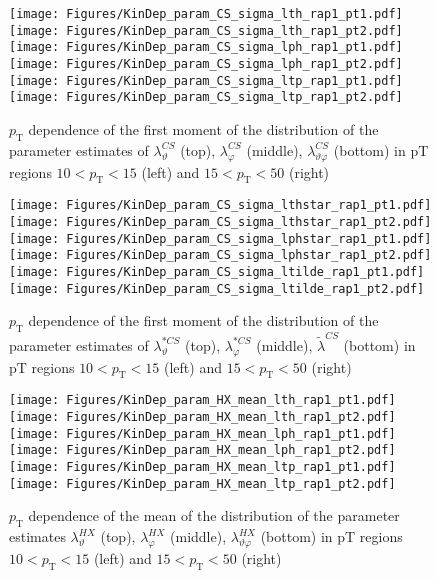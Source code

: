\documentclass[12pt]{article}
\newcommand{\pT}{p_\mathrm{T}}
\newcommand{\lamthCS}{\lambda^{\scriptscriptstyle CS}_\vartheta}
\newcommand{\lamphCS}{\lambda^{\scriptscriptstyle CS}_\varphi}
\newcommand{\lamthphCS}{\lambda^{\scriptscriptstyle CS}_{\vartheta \varphi}}
\newcommand{\lamtildeCS}{\tilde{\lambda}^{\scriptscriptstyle CS}}
\newcommand{\lamthstarCS}{\lambda^{* \scriptscriptstyle CS}_\vartheta}
\newcommand{\lamphstarCS}{\lambda^{* \scriptscriptstyle CS}_\varphi}
\newcommand{\lamthHX}{\lambda^{\scriptscriptstyle HX}_\vartheta}
\newcommand{\lamphHX}{\lambda^{\scriptscriptstyle HX}_\varphi}
\newcommand{\lamthphHX}{\lambda^{\scriptscriptstyle HX}_{\vartheta \varphi}}
\begin{document}
\begin{figure}[htbp]
\centering
\texttt{[image: Figures/KinDep\_param\_CS\_sigma\_lth\_rap1\_pt1.pdf]}
\texttt{[image: Figures/KinDep\_param\_CS\_sigma\_lth\_rap1\_pt2.pdf]}
\texttt{[image: Figures/KinDep\_param\_CS\_sigma\_lph\_rap1\_pt1.pdf]}
\texttt{[image: Figures/KinDep\_param\_CS\_sigma\_lph\_rap1\_pt2.pdf]}
\texttt{[image: Figures/KinDep\_param\_CS\_sigma\_ltp\_rap1\_pt1.pdf]}
\texttt{[image: Figures/KinDep\_param\_CS\_sigma\_ltp\_rap1\_pt2.pdf]}
\caption{$\pT$ dependence of the first moment of the distribution of the parameter estimates of $\lamthCS$ (top), $\lamphCS$ (middle), $\lamthphCS$ (bottom) in pT regions $10<\pT<15$ (left) and $15<\pT<50$ (right)}
\end{figure}
\clearpage

\begin{figure}[htbp]
\centering
\texttt{[image: Figures/KinDep\_param\_CS\_sigma\_lthstar\_rap1\_pt1.pdf]}
\texttt{[image: Figures/KinDep\_param\_CS\_sigma\_lthstar\_rap1\_pt2.pdf]}
\texttt{[image: Figures/KinDep\_param\_CS\_sigma\_lphstar\_rap1\_pt1.pdf]}
\texttt{[image: Figures/KinDep\_param\_CS\_sigma\_lphstar\_rap1\_pt2.pdf]}
\texttt{[image: Figures/KinDep\_param\_CS\_sigma\_ltilde\_rap1\_pt1.pdf]}
\texttt{[image: Figures/KinDep\_param\_CS\_sigma\_ltilde\_rap1\_pt2.pdf]}
\caption{$\pT$ dependence of the first moment of the distribution of the parameter estimates of $\lamthstarCS$ (top), $\lamphstarCS$ (middle), $\lamtildeCS$ (bottom) in pT regions $10<\pT<15$ (left) and $15<\pT<50$ (right)}
\end{figure}
\clearpage









\begin{figure}[htbp]
\centering
\texttt{[image: Figures/KinDep\_param\_HX\_mean\_lth\_rap1\_pt1.pdf]}
\texttt{[image: Figures/KinDep\_param\_HX\_mean\_lth\_rap1\_pt2.pdf]}
\texttt{[image: Figures/KinDep\_param\_HX\_mean\_lph\_rap1\_pt1.pdf]}
\texttt{[image: Figures/KinDep\_param\_HX\_mean\_lph\_rap1\_pt2.pdf]}
\texttt{[image: Figures/KinDep\_param\_HX\_mean\_ltp\_rap1\_pt1.pdf]}
\texttt{[image: Figures/KinDep\_param\_HX\_mean\_ltp\_rap1\_pt2.pdf]}
\caption{$\pT$ dependence of the mean of the distribution of the parameter estimates $\lamthHX$ (top), $\lamphHX$ (middle), $\lamthphHX$ (bottom) in pT regions $10<\pT<15$ (left) and $15<\pT<50$ (right)}
\end{figure}
\clearpage
\end{document}
